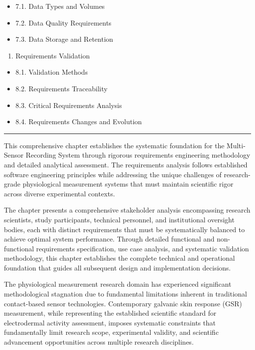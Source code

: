\documentclass[12pt,a4paper]{article}
\begin{document}
\begin{itemize}
\item 7.1. Data Types and Volumes
\item 7.2. Data Quality Requirements
\item 7.3. Data Storage and Retention
\end{itemize}
\begin{enumerate}
\item Requirements Validation
\end{enumerate}
\begin{itemize}
\item 8.1. Validation Methods
\item 8.2. Requirements Traceability
\item 8.3. Critical Requirements Analysis
\item 8.4. Requirements Changes and Evolution

\end{itemize}
\hrule

This comprehensive chapter establishes the systematic foundation for the Multi-Sensor Recording System through rigorous
requirements engineering methodology and detailed analytical assessment. The requirements analysis follows established
software engineering principles while addressing the unique challenges of research-grade physiological measurement
systems that must maintain scientific rigor across diverse experimental contexts.

The chapter presents a comprehensive stakeholder analysis encompassing research scientists, study participants,
technical personnel, and institutional oversight bodies, each with distinct requirements that must be systematically
balanced to achieve optimal system performance. Through detailed functional and non-functional requirements
specification, use case analysis, and systematic validation methodology, this chapter establishes the complete technical
and operational foundation that guides all subsequent design and implementation decisions.

The physiological measurement research domain has experienced significant methodological stagnation due to fundamental
limitations inherent in traditional contact-based sensor technologies. Contemporary galvanic skin response (GSR)
measurement, while representing the established scientific standard for electrodermal activity assessment, imposes
systematic constraints that fundamentally limit research scope, experimental validity, and scientific advancement
opportunities across multiple research disciplines.
\end{document}
